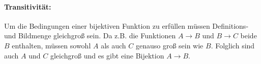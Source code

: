 \documentclass[11pt,a4paper]{article}
\begin{document}
\paragraph{Transitivität:}
Um die Bedingungen einer bijektiven Funktion zu erfüllen müssen Definitions- und Bildmenge gleichgroß sein. Da z.B. die Funktionen $A \rightarrow B$ und $B \rightarrow C$ beide $B$ enthalten, müssen sowohl $A$ als auch $C$ genauso groß sein wie $B$. Folglich sind auch $A$ und $C$ gleichgroß und es gibt eine Bijektion $A \rightarrow B$.
\end{document}
